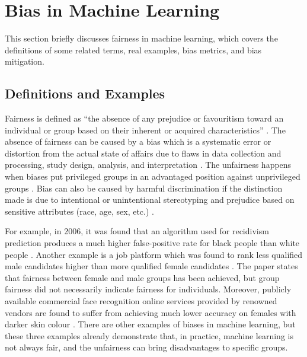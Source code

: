 \documentclass[sigconf]{acmart}
\begin{document}
	\section{Bias in Machine Learning}
	\label{sec:bias_in_machine_learning}
	This section briefly discusses fairness in machine learning, which covers the definitions of some related terms, real examples, bias metrics, and bias mitigation.
	
	\subsection{Definitions and Examples}
	\label{sec:definitions_and_examples}
	
	Fairness is defined as ``the absence of any prejudice or favouritism toward an individual or
	group based on their inherent or acquired characteristics'' \cite{mehrabi2021survey}.
	The absence of fairness can be caused by a bias which is a systematic error or distortion from the actual state of affairs due to flaws in data collection and processing, study design, analysis, and interpretation \cite{oxford2022bias}. 
	The unfairness happens when biases put privileged groups in an advantaged position against unprivileged groups \cite{bellamy2018ai}. 
	Bias can also be caused by harmful discrimination if the distinction made is due to intentional or unintentional stereotyping and prejudice based on sensitive attributes (race, age, sex, etc.) \cite{mehrabi2021survey,chen2019fairness}. 
	
	For example, in 2006, it was found that an algorithm used for recidivism prediction produces a much higher false-positive rate for black people than white people \cite{angwin2016machine}. Another example is a job platform which was found to rank less qualified male candidates higher than more qualified female candidates \cite{lahoti2019ifair}. The paper states that fairness between female and male groups has been achieved, but group fairness did not necessarily indicate fairness for individuals. Moreover, publicly available commercial face recognition online services provided by renowned vendors are found to suffer from achieving much lower accuracy on females with darker skin colour \cite{buolamwini2018gender}. There are other examples of biases in machine learning, but these three examples already demonstrate that, in practice, machine learning is not always fair, and the unfairness can bring disadvantages to specific groups. 
	
\end{document}
